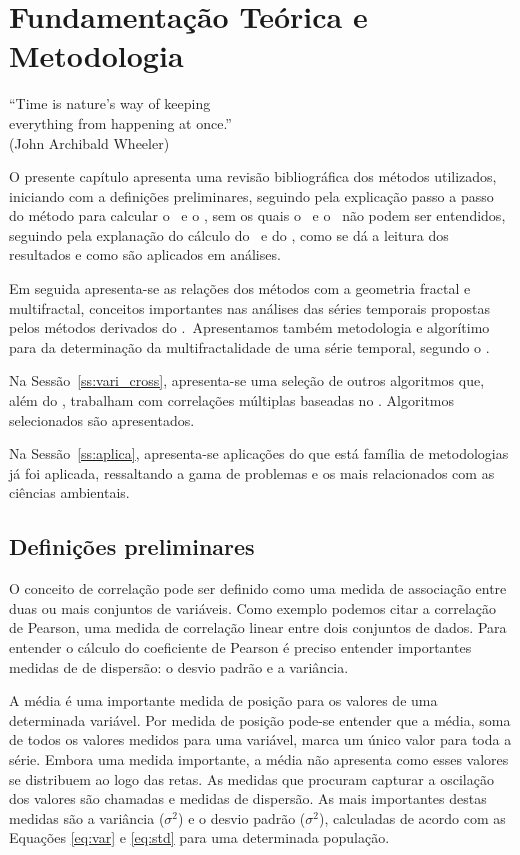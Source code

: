 \chapter{Fundamentação Teórica e Metodologia}
\label{cap:fund_teorica}

\begin{flushright}
  ``Time is nature's way of keeping \\
    everything from happening at once.''\\[10px]
  (John Archibald Wheeler)
\end{flushright}


O presente capítulo apresenta uma revisão bibliográfica dos métodos utilizados, iniciando com a definições preliminares, seguindo pela explicação passo a passo do método para calcular o \dfa~e o \dcca, sem os quais o \pdcca~e o \dmc~não podem ser entendidos, seguindo pela explanação do cálculo do \pdcca~e do \dmc, como se dá a leitura dos resultados e como são aplicados em análises.

Em seguida apresenta-se as relações dos métodos com a geometria fractal e multifractal, conceitos importantes nas análises das séries temporais propostas pelos métodos derivados do \dfa.~Apresentamos também metodologia e algorítimo para da determinação da multifractalidade de uma série temporal, segundo o \dfa.

Na Sessão~\ref{ss:vari_cross}, apresenta-se uma seleção de outros algoritmos que, além do \dmc, trabalham com correlações múltiplas baseadas no \dfa. Algoritmos selecionados são apresentados.

Na Sessão~\ref{ss:aplica}, apresenta-se aplicações do que está família de metodologias já foi aplicada, ressaltando a gama de problemas e os mais relacionados com as ciências ambientais.

\section{Definições preliminares}
\label{sec:def_pre}

O conceito de correlação pode ser definido como uma medida de associação entre duas ou mais conjuntos de variáveis. Como exemplo podemos citar a correlação de Pearson, uma medida de correlação linear entre dois conjuntos de dados. Para entender o cálculo do coeficiente de Pearson é preciso entender importantes medidas de de dispersão: o desvio padrão e a variância.

A média é uma importante medida de posição para os valores de uma determinada variável. Por medida de posição pode-se entender que a média, soma de todos os valores medidos para uma variável, marca um único valor para toda a série. Embora uma medida importante, a média não apresenta como esses valores se distribuem ao logo das retas. As medidas que procuram capturar a oscilação dos valores são chamadas e medidas de dispersão. As mais importantes destas medidas são a variância ($\sigma^2$) e o desvio padrão  ($\sigma^2$), calculadas de acordo com as Equações \ref{eq:var} e \ref{eq:std} para uma determinada população.

